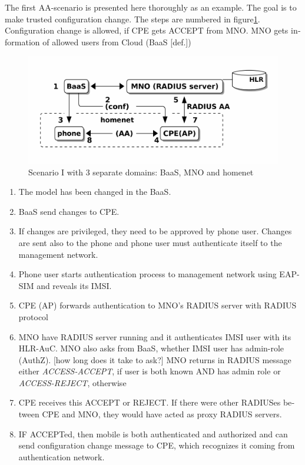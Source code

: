 \documentclass[12pt,a4paper,english]{tutthesis}
\begin{document}
\begin{otherlanguage}{english}
\label{scenario-i}
The first AA-scenario is presented here thoroughly as an example.
The goal is to make trusted configuration change. 
The steps are numbered in figure\ref{fig:scenario-I}.
Configuration change is allowed, if CPE gets ACCEPT from MNO.  MNO gets
information of allowed users from Cloud (BaaS [def.])


\begin{figure}[htb]
\centering
\includegraphics[width=.9\linewidth]{scenI.png}
\caption{\label{fig:scenario-I}Scenario I with 3 separate domains: BaaS, MNO and homenet}
\end{figure}


\begin{enumerate}
\item The model has been changed in the BaaS.
\item BaaS send changes to CPE.
\item If changes are privileged, they need to be approved by phone user.
Changes are sent also to the phone and phone user must authenticate
itself to the management network.
\item Phone user starts authentication process to management
network using EAP-SIM and reveals its IMSI.
\item CPE  (AP) forwards authentication to MNO's RADIUS server with
RADIUS protocol
\item MNO have RADIUS server running and it authenticates IMSI user with
  its HLR-AuC.
MNO also asks from BaaS, whether IMSI user has admin-role (AuthZ). [how long does it take to ask?]
MNO returns in RADIUS message either \emph{ACCESS-ACCEPT}, if user is both known AND has admin role 
  or \emph{ACCESS-REJECT}, otherwise
\item CPE receives this ACCEPT or REJECT. If there were other RADIUSes
between CPE and MNO, they would have acted
as proxy RADIUS servers.
\item IF ACCEPTed, then mobile is both authenticated and authorized and
can send configuration change message to CPE, which recognizes it
coming from authentication network.


\end{enumerate}
\end{otherlanguage}
\end{document}
